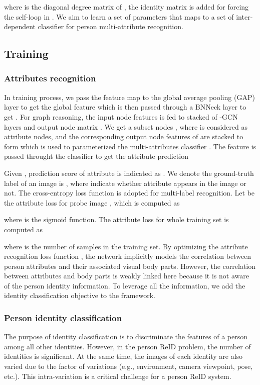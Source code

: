 \documentclass[final]{cvpr}
\begin{document}
where  is the diagonal degree matrix of , the identity matrix  is added for forcing the self-loop in . We aim to learn a set of parameters  that maps  to a set of inter-dependent classifier for person multi-attribute recognition.

\subsection{Training}
\label{sec:train}
\subsubsection{Attributes recognition}
In training process, we pass the feature map  to the global average pooling (GAP) layer to get the global feature  which is then passed through a BNNeck layer \cite{BoT} to get . For graph reasoning, the input node features  is fed to stacked of -GCN layers and output node matrix . We get a subset nodes , where  is considered as attribute nodes, and the corresponding output node features of  are stacked to form  which is used to parameterized the multi-attributes classifier . The feature  is passed throught the classifier  to get the attribute prediction 

Given , prediction score of attribute  is indicated as . We denote the ground-truth label of an image is , where  indicate whether attribute  appears in the image or not. The cross-entropy loss function is adopted for multi-label recognition. Let  be the attribute loss for probe image , which is computed as

where  is the sigmoid function. The attribute loss for whole training set is computed as 

where  is the number of samples in the training set. By optimizing the attribute recognition loss function , the network implicitly models the correlation between person attributes and their associated visual body parts. However, the correlation between attributes and body parts is weakly linked here because it is not aware of the person identity information. To leverage all the information, we add the identity classification objective to the framework.

\subsubsection{Person identity classification} The purpose of identity classification is to discriminate the features of a person among all other identities. However, in the person ReID problem, the number of identities is significant. At the same time, the images of each identity are also varied due to the factor of variations (e.g., environment, camera viewpoint, pose, etc.). This intra-variation is a critical challenge for a person ReID system.
\end{document}
